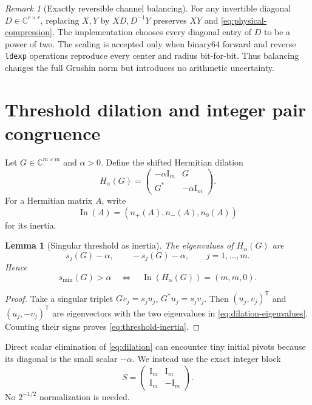 \documentclass[11pt]{article}
\newtheorem{lemma}[theorem]{Lemma}
\theoremstyle{definition}
\theoremstyle{remark}
\newtheorem{remark}[theorem]{Remark}
\newcommand{\C}{\mathbb C}
\newcommand{\Id}{\mathrm I}
\newcommand{\inn}{\operatorname{In}}
\begin{document}
\begin{remark}[Exactly reversible channel balancing]
\label{rem:balancing}
For any invertible diagonal $D\in\C^{r\times r}$, replacing
$X,Y$ by $XD,D^{-1}Y$ preserves $XY$ and
\cref{eq:physical-compression}.  The implementation chooses every diagonal
entry of $D$ to be a power of two.  The scaling is accepted only when
binary64 forward and reverse \texttt{ldexp} operations reproduce every
center and radius bit-for-bit.  Thus balancing changes the full Grushin norm
but introduces no arithmetic uncertainty.
\end{remark}


\section{Threshold dilation and integer pair congruence}
\label{sec:threshold}

Let $G\in\C^{m\times m}$ and $\alpha>0$.  Define the shifted Hermitian
dilation
\begin{equation}
 H_\alpha(G)=
 \begin{pmatrix}
  -\alpha\Id_m&G\\
  G^*&-\alpha\Id_m
 \end{pmatrix}.
 \label{eq:dilation}
\end{equation}
For a Hermitian matrix $A$, write
\[
 \inn(A)=(n_+(A),n_-(A),n_0(A))
\]
for its inertia.

\begin{lemma}[Singular threshold as inertia]
\label{lem:threshold-inertia}
The eigenvalues of $H_\alpha(G)$ are
\begin{equation}
 s_j(G)-\alpha,\qquad -s_j(G)-\alpha,
 \qquad j=1,\dots,m.
 \label{eq:dilation-eigenvalues}
\end{equation}
Hence
\begin{equation}
 s_{\min}(G)>\alpha
 \quad\Longleftrightarrow\quad
 \inn(H_\alpha(G))=(m,m,0).
 \label{eq:threshold-inertia}
\end{equation}
\end{lemma}

\begin{proof}
Take a singular triplet $Gv_j=s_ju_j$, $G^*u_j=s_jv_j$.
Then $(u_j,v_j)^{\mathsf T}$ and $(u_j,-v_j)^{\mathsf T}$ are eigenvectors
with the two eigenvalues in \cref{eq:dilation-eigenvalues}.  Counting their
signs proves \cref{eq:threshold-inertia}.
\end{proof}

Direct scalar elimination of \cref{eq:dilation} can encounter tiny initial
pivots because its diagonal is the small scalar $-\alpha$.  We instead use
the exact integer block
\begin{equation}
 S=
 \begin{pmatrix}
  \Id_m&\Id_m\\
  \Id_m&-\Id_m
 \end{pmatrix}.
 \label{eq:hadamard}
\end{equation}
No $2^{-1/2}$ normalization is needed.
\end{document}

